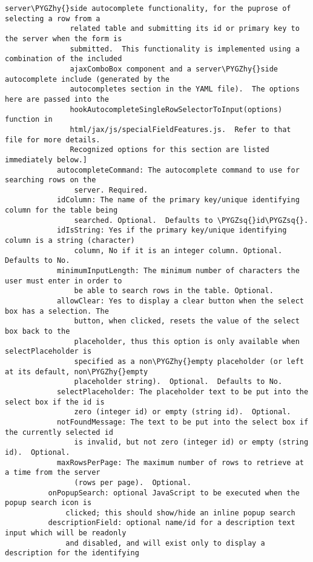 \documentclass[letterpaper,10pt,english]{sphinxmanual}
\def\PYGZhy{\char`\-}
\def\PYGZsq{\char`\'}
\renewcommand\PYGZsq{\textquotesingle}
\begin{document}
\begin{Verbatim}[commandchars=\\\{\}]
               server\PYGZhy{}side autocomplete functionality, for the puprose of selecting a row from a
               related table and submitting its id or primary key to the server when the form is
               submitted.  This functionality is implemented using a combination of the included
               ajaxComboBox component and a server\PYGZhy{}side autocomplete include (generated by the
               autocompletes section in the YAML file).  The options here are passed into the
               hookAutocompleteSingleRowSelectorToInput(options) function in
               html/jax/js/specialFieldFeatures.js.  Refer to that file for more details.
               Recognized options for this section are listed immediately below.]
            autocompleteCommand: The autocomplete command to use for searching rows on the
                server. Required.
            idColumn: The name of the primary key/unique identifying column for the table being
                searched. Optional.  Defaults to \PYGZsq{}id\PYGZsq{}.
            idIsString: Yes if the primary key/unique identifying column is a string (character)
                column, No if it is an integer column. Optional. Defaults to No.
            minimumInputLength: The minimum number of characters the user must enter in order to
                be able to search rows in the table. Optional.
            allowClear: Yes to display a clear button when the select box has a selection. The
                button, when clicked, resets the value of the select box back to the
                placeholder, thus this option is only available when selectPlaceholder is
                specified as a non\PYGZhy{}empty placeholder (or left at its default, non\PYGZhy{}empty
                placeholder string).  Optional.  Defaults to No.
            selectPlaceholder: The placeholder text to be put into the select box if the id is
                zero (integer id) or empty (string id).  Optional.
            notFoundMessage: The text to be put into the select box if the currently selected id
                is invalid, but not zero (integer id) or empty (string id).  Optional.
            maxRowsPerPage: The maximum number of rows to retrieve at a time from the server
                (rows per page).  Optional.
          onPopupSearch: optional JavaScript to be executed when the popup search icon is
              clicked; this should show/hide an inline popup search
          descriptionField: optional name/id for a description text input which will be readonly
              and disabled, and will exist only to display a description for the identifying

\end{Verbatim}
\end{document}
